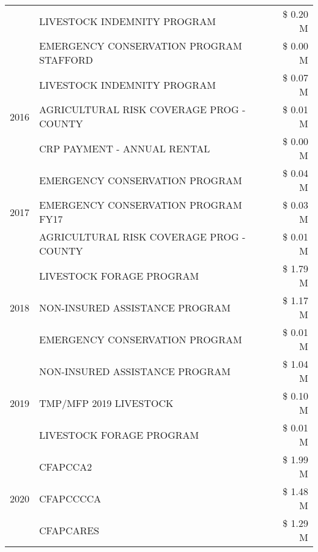 \begin{tabular}{llr}
 & LIVESTOCK INDEMNITY PROGRAM & \$ 0.20 M \\
 & EMERGENCY CONSERVATION PROGRAM STAFFORD & \$ 0.00 M \\
\cline{1-3}
\multirow[t]{3}{*}{2016} & LIVESTOCK INDEMNITY PROGRAM                   & \$ 0.07 M \\
 & AGRICULTURAL RISK COVERAGE PROG - COUNTY      & \$ 0.01 M \\
 & CRP PAYMENT - ANNUAL RENTAL                   & \$ 0.00 M \\
\cline{1-3}
\multirow[t]{3}{*}{2017} & EMERGENCY CONSERVATION PROGRAM & \$ 0.04 M \\
 & EMERGENCY CONSERVATION PROGRAM FY17 & \$ 0.03 M \\
 & AGRICULTURAL RISK COVERAGE PROG - COUNTY & \$ 0.01 M \\
\cline{1-3}
\multirow[t]{3}{*}{2018} & LIVESTOCK FORAGE PROGRAM & \$ 1.79 M \\
 & NON-INSURED ASSISTANCE PROGRAM & \$ 1.17 M \\
 & EMERGENCY CONSERVATION PROGRAM & \$ 0.01 M \\
\cline{1-3}
\multirow[t]{3}{*}{2019} & NON-INSURED ASSISTANCE PROGRAM & \$ 1.04 M \\
 & TMP/MFP 2019 LIVESTOCK & \$ 0.10 M \\
 & LIVESTOCK FORAGE PROGRAM & \$ 0.01 M \\
\cline{1-3}
\multirow[t]{3}{*}{2020} & CFAPCCA2 & \$ 1.99 M \\
 & CFAPCCCCA & \$ 1.48 M \\
 & CFAPCARES & \$ 1.29 M \\
\cline{1-3}
\bottomrule
\end{tabular}
